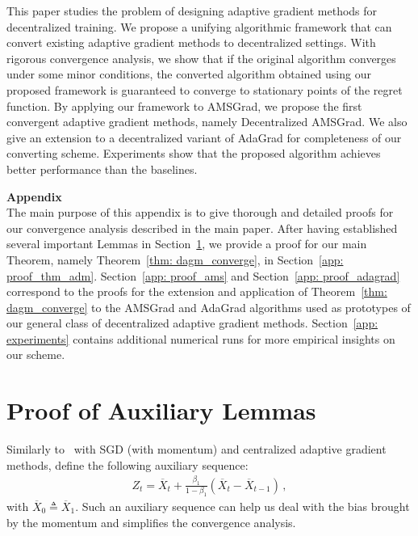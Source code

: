 \documentclass[11pt]{article}
\begin{document}
This paper studies the problem of designing adaptive gradient methods for decentralized training. 
We propose a unifying algorithmic framework that can convert existing adaptive gradient methods to decentralized settings. 
With rigorous convergence analysis, we show that if the original algorithm converges under some minor conditions, the converted algorithm obtained using our proposed framework is guaranteed to converge to stationary points of the regret function. 
By applying our framework to AMSGrad, we propose the first convergent adaptive gradient methods, namely Decentralized AMSGrad. 
We also give an extension to a decentralized variant of AdaGrad for completeness of our converting scheme.
Experiments show that the proposed algorithm achieves better performance than the baselines. 


\clearpage




\clearpage 
\newpage
\appendix
%


\noindent\textbf{\LARGE Appendix}\\

The main purpose of this appendix is to give thorough and detailed proofs for our convergence analysis described in the main paper.
After having established several important Lemmas in Section~\ref{app: proof_lemmas}, we provide a proof for our main Theorem, namely Theorem~\ref{thm: dagm_converge}, in Section~\ref{app: proof_thm_adm}.
Section~\ref{app: proof_ams} and Section~\ref{app: proof_adagrad} correspond to the proofs for the extension and application of Theorem~\ref{thm: dagm_converge} to the AMSGrad and AdaGrad algorithms used as prototypes of our general class of decentralized adaptive gradient methods.
Section~\ref{app: experiments} contains additional numerical runs for more empirical insights on our scheme.
 
\section{Proof of Auxiliary Lemmas} \label{app: proof_lemmas}

Similarly to~\cite{yan2018unified, chen2018convergence} with SGD (with momentum) and centralized adaptive gradient methods, define the following auxiliary sequence:
 \begin{align}\label{eq: seq_z_sketchapp}
 Z_{t} = \overline X_t + \frac{\beta_1}{1-\beta_1} (\overline X_t - \overline X_{t-1}) \, ,
 \end{align}
with $\overline X_{0} \triangleq \overline X_1$.
Such an auxiliary sequence can help us deal with the bias brought by the momentum and simplifies the convergence analysis. 
\end{document}
